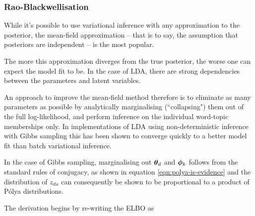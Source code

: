 \subsubsection{Rao-Blackwellisation}
While it's possible to use variational inference with any approximation to the posterior, the mean-field approximation -- that is to say, the assumption that posteriors are independent -- is the most popular. 

The more this approximation diverges from the true posterior, the worse one can expect the model fit to be. In the case of LDA, there are strong dependencies between the parameters and latent variables.

An approach to improve the mean-field method therefore is to eliminate as many parameters as possible by analytically marginalising (``collapsing") them out of the full log-likelihood, and perform inference on the individual word-topic memberships only. In implementations of LDA using non-deterministic inference with Gibbs sampling\cite{Griffiths2004} this has been shown to converge quickly to a better model fit than batch variational inference\cite{Asuncion2012}.

In the case of Gibbs sampling, marginalising out ${ \bm \theta_d }$ and $\bm \phi_k$ follows from the standard rules of conjugacy, as shown in equation \eqref{eqn:polya-is-evidence} and the distribution of $z_{dn}$ can consequently be shown\cite{Griffiths2004}\cite{Heinrich2005} to be proportional to a product of P\'olya distributions.

The derivation begins by re-writing the ELBO as

